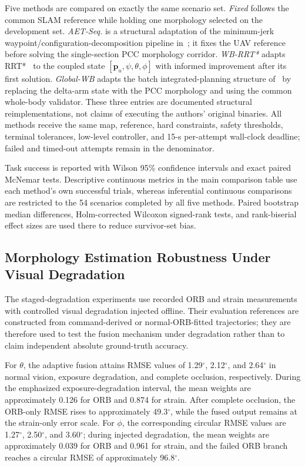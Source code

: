 \documentclass[journal,twoside]{IEEEtran}
\begin{document}
Five methods are compared on exactly the same scenario set. \emph{Fixed} follows the common SLAM reference while holding one morphology selected on the development set. \emph{AET-Seq.} is a structural adaptation of the minimum-jerk waypoint/configuration-decomposition pipeline in~\cite{peng2025aet}; it fixes the UAV reference before solving the single-section PCC morphology corridor. \emph{WB-RRT*} adapts RRT*~\cite{karaman2011sampling,meng2022rrtstar} to the coupled state $[\mathbf p_u,\psi,\theta,\phi]$ with informed improvement after its first solution. \emph{Global-WB} adapts the batch integrated-planning structure of~\cite{deng2025wholebody} by replacing the delta-arm state with the PCC morphology and using the common whole-body validator. These three entries are documented structural reimplementations, not claims of executing the authors' original binaries. All methods receive the same map, reference, hard constraints, safety thresholds, terminal tolerances, low-level controller, and 15-s per-attempt wall-clock deadline; failed and timed-out attempts remain in the denominator.

Task success is reported with Wilson 95\% confidence intervals and exact paired McNemar tests. Descriptive continuous metrics in the main comparison table use each method's own successful trials, whereas inferential continuous comparisons are restricted to the 54 scenarios completed by all five methods. Paired bootstrap median differences, Holm-corrected Wilcoxon signed-rank tests, and rank-biserial effect sizes are used there to reduce survivor-set bias.

\subsection{Morphology Estimation Robustness Under Visual Degradation}
The staged-degradation experiments use recorded ORB and strain measurements with controlled visual degradation injected offline. Their evaluation references are constructed from command-derived or normal-ORB-fitted trajectories; they are therefore used to test the fusion mechanism under degradation rather than to claim independent absolute ground-truth accuracy.

For $\theta$, the adaptive fusion attains RMSE values of 1.29$^\circ$, 2.12$^\circ$, and 2.64$^\circ$ in normal vision, exposure degradation, and complete occlusion, respectively. During the emphasized exposure-degradation interval, the mean weights are approximately 0.126 for ORB and 0.874 for strain. After complete occlusion, the ORB-only RMSE rises to approximately 49.3$^\circ$, while the fused output remains at the strain-only error scale. For $\phi$, the corresponding circular RMSE values are 1.27$^\circ$, 2.50$^\circ$, and 3.60$^\circ$; during injected degradation, the mean weights are approximately 0.039 for ORB and 0.961 for strain, and the failed ORB branch reaches a circular RMSE of approximately 96.8$^\circ$.
\end{document}
